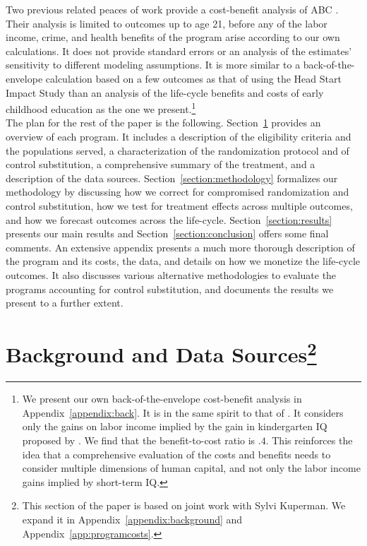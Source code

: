 \noindent Two previous related peaces of work provide a cost-benefit analysis of ABC \citep{Masse_Barnett_2002_BOOKBenefitCostAnalysis,Barnett_Masse_2007_EER}. Their analysis is limited to outcomes up to age 21, before any of the labor income, crime, and health benefits of the program arise according to our own calculations. It does not provide standard errors or an analysis of the estimates' sensitivity to different modeling assumptions. It is more similar to a back-of-the-envelope calculation based on a few outcomes as that of \citet{Kline-Walters_2015_NBER-Evaluating} using the Head Start Impact Study than an analysis of the life-cycle benefits and costs of early childhood education as the one we present.\footnote{We present our own back-of-the-envelope cost-benefit analysis in Appendix~\ref{appendix:back}. It is in the same spirit to that of \citet{
Kline-Walters_2015_NBER-Evaluating}. It considers only the gains on labor income implied by the gain in kindergarten IQ proposed by \citet{
Chetty_Friedman_etal_2011_QJoE}. We find that the benefit-to-cost ratio is $.4$. This reinforces the idea that a comprehensive evaluation of the costs and benefits needs to consider multiple dimensions of human capital, and not only the labor income gains implied by short-term IQ.} \\ 

\noindent The plan for the rest of the paper is the following. Section~\ref{section:background}  provides an overview of each program. It includes a description of the eligibility criteria and the populations served, a characterization of the randomization protocol and of control substitution, a comprehensive summary of the treatment, and a description of the data sources. Section~\ref{section:methodology} formalizes our methodology by discussing how we correct for compromised randomization and control substitution, how we test for treatment effects across multiple outcomes, and how we forecast outcomes across the life-cycle. Section~\ref{section:results} presents our main results and Section~\ref{section:conclusion} offers some final comments. An extensive appendix presents a much more thorough description of the program and its costs, the data, and details on how we monetize the life-cycle outcomes. It also discusses various alternative methodologies to evaluate the programs accounting for control substitution, and documents the results we present to a further extent.

\section[Background and Data Sources]{Background and Data Sources\footnote{This section of the paper is based on joint work with Sylvi Kuperman. We expand it  in Appendix~\ref{appendix:background} and Appendix~\ref{app:programcosts}.}} \label{section:background}

